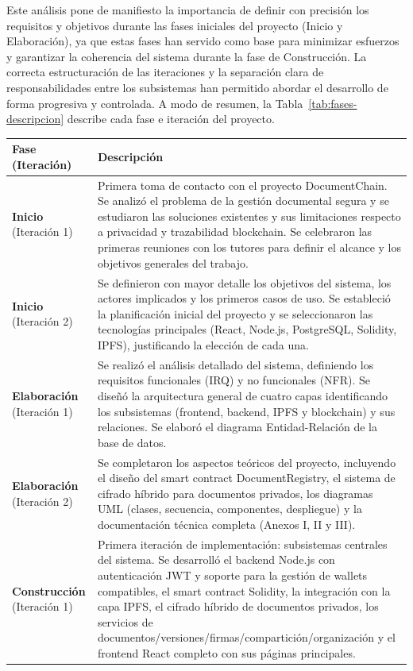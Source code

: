 \documentclass[11pt, a4paper]{article}
\begin{document}
Este análisis pone de manifiesto la importancia de definir con precisión los requisitos y objetivos durante las fases iniciales del proyecto (Inicio y Elaboración), ya que estas fases han servido como base para minimizar esfuerzos y garantizar la coherencia del sistema durante la fase de Construcción. La correcta estructuración de las iteraciones y la separación clara de responsabilidades entre los subsistemas han permitido abordar el desarrollo de forma progresiva y controlada. A modo de resumen, la Tabla~\ref{tab:fases-descripcion} describe cada fase e iteración del proyecto.
\begin{table}[H]
\centering
\begin{tabular}{|p{4cm}|p{10cm}|}
\hline
\textbf{Fase (Iteración)} & \textbf{Descripción} \\
\hline
\textbf{Inicio} (Iteración 1) &
Primera toma de contacto con el proyecto DocumentChain. Se analizó el problema de la gestión documental segura y se estudiaron las soluciones existentes y sus limitaciones respecto a privacidad y trazabilidad blockchain. Se celebraron las primeras reuniones con los tutores para definir el alcance y los objetivos generales del trabajo. \\
\hline
\textbf{Inicio} (Iteración 2) &
Se definieron con mayor detalle los objetivos del sistema, los actores implicados y los primeros casos de uso. Se estableció la planificación inicial del proyecto y se seleccionaron las tecnologías principales (React, Node.js, PostgreSQL, Solidity, IPFS), justificando la elección de cada una. \\
\hline
\textbf{Elaboración} (Iteración 1) &
Se realizó el análisis detallado del sistema, definiendo los requisitos funcionales (IRQ) y no funcionales (NFR). Se diseñó la arquitectura general de cuatro capas identificando los subsistemas (frontend, backend, IPFS y blockchain) y sus relaciones. Se elaboró el diagrama Entidad-Relación de la base de datos. \\
\hline
\textbf{Elaboración} (Iteración 2) &
Se completaron los aspectos teóricos del proyecto, incluyendo el diseño del smart contract DocumentRegistry, el sistema de cifrado híbrido para documentos privados, los diagramas UML (clases, secuencia, componentes, despliegue) y la documentación técnica completa (Anexos I, II y III). \\
\hline
\textbf{Construcción} (Iteración 1) &
Primera iteración de implementación: subsistemas centrales del sistema. Se desarrolló el backend Node.js con autenticación JWT y soporte para la gestión de wallets compatibles, el smart contract Solidity, la integración con la capa IPFS, el cifrado híbrido de documentos privados, los servicios de documentos/versiones/firmas/compartición/organización y el frontend React completo con sus páginas principales. \\

\end{tabular}
\end{table}
\end{document}
